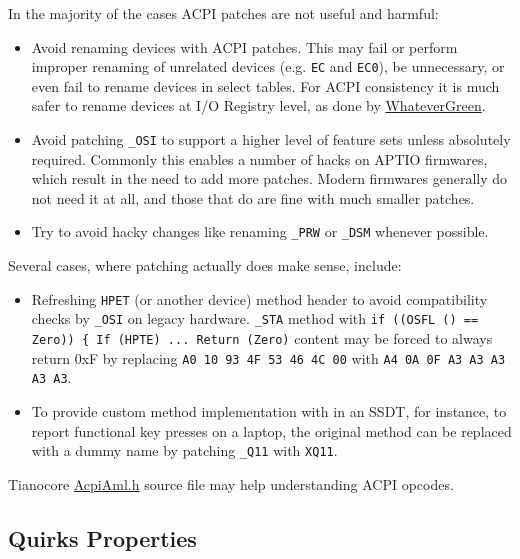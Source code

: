 \documentclass[]{article}
\makeatletter
\renewcommand{\label}[1]{%
\zref@wrapper@immediate{\oldlabel{#1}}}  %
\makeatother
\begin{document}
In the majority of the cases ACPI patches are not useful and harmful:

\begin{itemize}
\item
  Avoid renaming devices with ACPI patches. This may fail or perform
  improper renaming of unrelated devices (e.g. \texttt{EC} and
  \texttt{EC0}), be unnecessary, or even fail to rename devices in select tables. For
  ACPI consistency it is much safer to rename devices at I/O Registry
  level, as done by
  \href{https://github.com/acidanthera/WhateverGreen}{WhateverGreen}.
\item
  Avoid patching \texttt{\_OSI} to support a higher level of feature sets
  unless absolutely required. Commonly this enables a number of hacks on APTIO
  firmwares, which result in the need to add more patches. Modern firmwares
  generally do not need it at all, and those that do are fine with much
  smaller patches.
\item
  Try to avoid hacky changes like renaming \texttt{\_PRW} or \texttt{\_DSM}
  whenever possible.
\end{itemize}

Several cases, where patching actually does make sense, include:

\begin{itemize}
\item
  Refreshing \texttt{HPET} (or another device) method header to avoid
  compatibility checks by \texttt{\_OSI} on legacy hardware. \texttt{\_STA}
  method with \texttt{if ((OSFL () == Zero)) \{ If (HPTE)  ...  Return (Zero)}
  content may be forced to always return 0xF by replacing
  \texttt{A0 10 93 4F 53 46 4C 00} with \texttt{A4 0A 0F A3 A3 A3 A3 A3}.
\item
  To provide custom method implementation with in an SSDT, for instance,
  to report functional key presses on a laptop, the original method can be replaced
  with a dummy name by patching \texttt{\_Q11} with \texttt{XQ11}.
\end{itemize}

Tianocore \href{https://github.com/tianocore/edk2/blob/UDK2018/MdePkg/Include/IndustryStandard/AcpiAml.h}{AcpiAml.h}
source file may help understanding ACPI opcodes.

\subsection{Quirks Properties}\label{acpipropsquirks}
\end{document}
